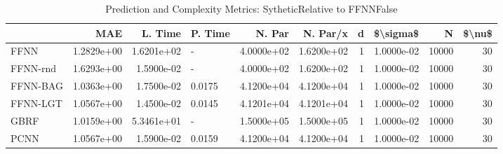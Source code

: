 \begin{table}
\centering
\caption{Prediction and Complexity Metrics: SytheticRelative to FFNNFalse}
\label{tab__Sythetic__Fix_Neurons_QTrue}
\begin{tabular}{lrrlrrrrrr}
\toprule
{} &        MAE &    L. Time & P. Time &     N. Par &   N. Par/x &  d &   \$\textbackslash sigma\$ &      N &  \$\textbackslash nu\$ \\
\midrule
FFNN     & 1.2829e+00 & 1.6201e+02 &       - & 4.0000e+02 & 1.6200e+02 &  1 & 1.0000e-02 &  10000 &     30 \\
FFNN-rnd & 1.6293e+00 & 1.5900e-02 &       - & 4.0000e+02 & 1.6200e+02 &  1 & 1.0000e-02 &  10000 &     30 \\
FFNN-BAG & 1.0363e+00 & 1.7500e-02 &  0.0175 & 4.1200e+04 & 4.1200e+04 &  1 & 1.0000e-02 &  10000 &     30 \\
FFNN-LGT & 1.0567e+00 & 1.4500e-02 &  0.0145 & 4.1201e+04 & 4.1201e+04 &  1 & 1.0000e-02 &  10000 &     30 \\
GBRF     & 1.0159e+00 & 5.3461e+01 &       - & 1.5000e+05 & 1.5000e+05 &  1 & 1.0000e-02 &  10000 &     30 \\
PCNN     & 1.0567e+00 & 1.5900e-02 &  0.0159 & 4.1200e+04 & 4.1200e+04 &  1 & 1.0000e-02 &  10000 &     30 \\
\bottomrule
\end{tabular}
\end{table}
